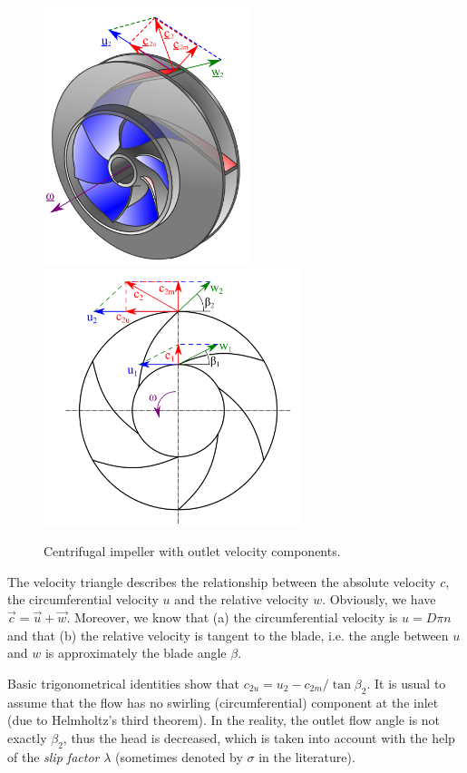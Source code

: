 \begin{figure}[ht]
\begin{center}
\includegraphics[width=6cm]{figs/Impeller3D_and_VelocityTriangles_v2.png}
\hspace{0.5cm}
\includegraphics[width=7.5cm]{figs/Impeller2D_and_VelocityTriangles.png}
\caption{\label{fig:centrifual_pumps_velocity_triangle}Centrifugal impeller with outlet velocity components.}
\end{center}
\end{figure}

The velocity triangle describes the relationship between the absolute velocity $c$, the circumferential velocity $u$ and the relative velocity $w$. Obviously, we have $\vec{c}=\vec{u}+\vec{w}$. Moreover, we know that (a) the circumferential velocity is $u=D \pi n$ and that (b) the relative velocity is tangent to the blade, i.e. the angle between $u$ and $w$ is approximately the blade angle $\beta$.

Basic trigonometrical identities show that $c_{2u}=u_2-c_{2m}/\tan \beta_2$. It is usual to assume that the flow has no swirling (circumferential) component at the inlet (due to Helmholtz's third theorem). In the reality, the outlet flow angle is not exactly $\beta_2$, thus the head is decreased, which is taken into account with the help of the \emph{slip factor} $\lambda$ (sometimes denoted by $\sigma$ in the literature).

